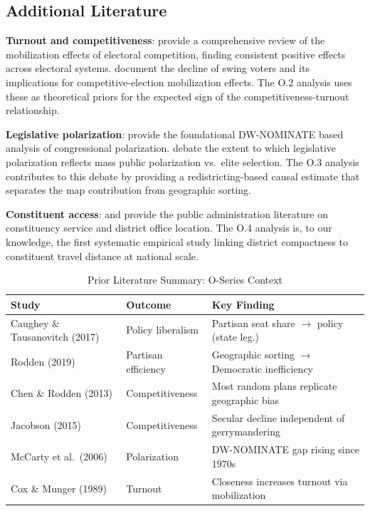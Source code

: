 \subsection{Additional Literature}

\textbf{Turnout and competitiveness}: \citet{cox2008} provide a comprehensive review
of the mobilization effects of electoral competition, finding consistent positive effects
across electoral systems. \citet{abramowitz2010} document the decline of swing voters
and its implications for competitive-election mobilization effects. The O.2 analysis
uses these as theoretical priors for the expected sign of the competitiveness-turnout
relationship.

\textbf{Legislative polarization}: \citet{mccarty2006} provide the foundational
DW-NOMINATE based analysis of congressional polarization. \citet{fiorina2008}
debate the extent to which legislative polarization reflects mass public polarization
vs.\ elite selection. The O.3 analysis contributes to this debate by providing
a redistricting-based causal estimate that separates the map contribution from
geographic sorting.

\textbf{Constituent access}: \citet{eckels2020} and \citet{meier1995} provide
the public administration literature on constituency service and district office
location. The O.4 analysis is, to our knowledge, the first systematic empirical
study linking district compactness to constituent travel distance at national scale.

\begin{table}[ht]
\centering
\caption{Prior Literature Summary: O-Series Context}
\label{tab:literature}
\begin{tabular}{llp{6cm}}
\toprule
Study & Outcome & Key Finding \\
\midrule
Caughey \& Tausanovitch (2017) & Policy liberalism & Partisan seat share $\to$ policy (state leg.) \\
Rodden (2019) & Partisan efficiency & Geographic sorting $\to$ Democratic inefficiency \\
Chen \& Rodden (2013) & Competitiveness & Most random plans replicate geographic bias \\
Jacobson (2015) & Competitiveness & Secular decline independent of gerrymandering \\
McCarty et al.\ (2006) & Polarization & DW-NOMINATE gap rising since 1970s \\
Cox \& Munger (1989) & Turnout & Closeness increases turnout via mobilization \\
\bottomrule
\end{tabular}
\end{table}
